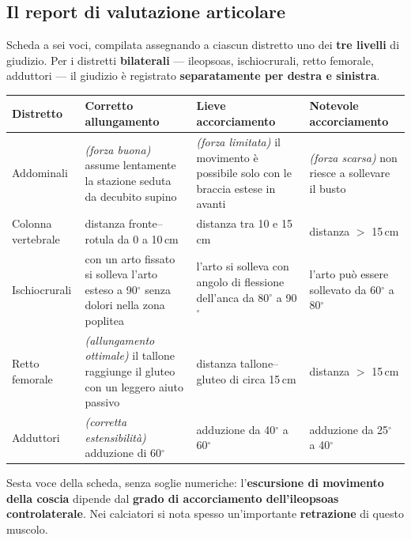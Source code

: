 \subsection{Il report di valutazione articolare}

Scheda a sei voci, compilata assegnando a ciascun distretto uno dei \textbf{tre livelli} di giudizio.
Per i distretti \textbf{bilaterali} --- ileopsoas, ischiocrurali, retto femorale, adduttori --- il
giudizio è registrato \textbf{separatamente per destra e sinistra}.

\begin{table}[htbp]
  \centering
  \small
  \renewcommand{\arraystretch}{1.3}
  \begin{tabularx}{\textwidth}{|l|X|X|X|}
    \hline
    \textbf{Distretto} & \textbf{Corretto allungamento} & \textbf{Lieve accorciamento} &
      \textbf{Notevole accorciamento} \\
    \hline
    Addominali & \textit{(forza buona)} assume lentamente la stazione seduta da decubito supino &
      \textit{(forza limitata)} il movimento è possibile solo con le braccia estese in avanti &
      \textit{(forza scarsa)} non riesce a sollevare il busto \\
    \hline
    Colonna vertebrale & distanza fronte--rotula da 0 a 10\,cm & distanza tra 10 e 15\,cm &
      distanza $>$ 15\,cm \\
    \hline
    Ischiocrurali & con un arto fissato si solleva l'arto esteso a 90$^\circ$ senza dolori nella
      zona poplitea & l'arto si solleva con angolo di flessione dell'anca da 80$^\circ$ a 90$^\circ$ &
      l'arto può essere sollevato da 60$^\circ$ a 80$^\circ$ \\
    \hline
    Retto femorale & \textit{(allungamento ottimale)} il tallone raggiunge il gluteo con un leggero
      aiuto passivo & distanza tallone--gluteo di circa 15\,cm & distanza $>$ 15\,cm \\
    \hline
    Adduttori & \textit{(corretta estensibilità)} adduzione di 60$^\circ$ & adduzione da 40$^\circ$
      a 60$^\circ$ & adduzione da 25$^\circ$ a 40$^\circ$ \\
    \hline
  \end{tabularx}
\end{table}

Sesta voce della scheda, senza soglie numeriche: l'\textbf{escursione di movimento della coscia}
dipende dal \textbf{grado di accorciamento dell'ileopsoas controlaterale}. Nei calciatori si nota
spesso un'importante \textbf{retrazione} di questo muscolo.

